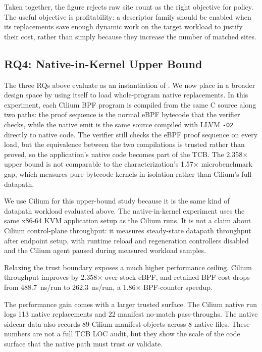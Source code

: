 Taken together, the figure rejects raw site count as the right objective for \lang policy. The useful objective is profitability: a descriptor family should be enabled when its replacements save enough dynamic work on the target workload to justify their cost, rather than simply because they increase the number of matched sites.


\subsection{RQ4: Native-in-Kernel Upper Bound}
\label{subsec:native_upper_bound}

The three RQs above evaluate \lang as an instantiation of \tool. We now place \tool in a broader design space by using \tool itself to load whole-program native replacements. In this experiment, each Cilium BPF program is compiled from the same C source along two paths: the proof sequence is the normal eBPF bytecode that the verifier checks, while the native emit is the same source compiled with LLVM \texttt{-O2} directly to native code. The verifier still checks the eBPF proof sequence on every load, but the equivalence between the two compilations is trusted rather than proved, so the application's native code becomes part of the TCB. The 2.358$\times$ upper bound is not comparable to the characterization's 1.57$\times$ microbenchmark gap, which measures pure-bytecode kernels in isolation rather than Cilium's full datapath.

We use Cilium for this upper-bound study because it is the same kind of datapath workload evaluated above. The native-in-kernel experiment uses the same x86-64 KVM application setup as the Cilium \lang runs. It is not a claim about Cilium control-plane throughput: it measures steady-state datapath throughput after endpoint setup, with runtime reload and regeneration controllers disabled and the Cilium agent paused during measured workload samples.

Relaxing the trust boundary exposes a much higher performance ceiling. Cilium throughput improves by 2.358$\times$ over stock eBPF, and retained BPF cost drops from 488.7~ns/run to 262.3~ns/run, a 1.86$\times$ BPF-counter speedup.

The performance gain comes with a larger trusted surface. The Cilium native run logs 113 native replacements and 22 manifest no-match pass-throughs. The native sidecar data also records 89 Cilium manifest objects across 8 native files. These numbers are not a full TCB LOC audit, but they show the scale of the code surface that the native path must trust or validate.

